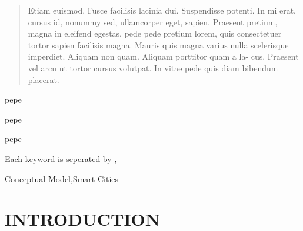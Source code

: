 \documentclass[a4paper,fleqn,spanish]{cas-dc}
\begin{document}
{{%
% 
 \fnmark[2]
% 
 \ead{}
% 
 \ead[url]{}
% 
 \credit{}
% 
% 



\nonumnote{}


\begin{abstract}
Etiam euismod. Fusce facilisis lacinia dui. Suspendisse potenti. In mi erat,
cursus id, nonummy sed, ullamcorper eget, sapien. Praesent pretium, magna in
eleifend egestas, pede pede pretium lorem, quis consectetuer tortor sapien
facilisis magna. Mauris quis magna varius nulla scelerisque imperdiet. Aliquam
non quam. Aliquam porttitor quam a la- cus. Praesent vel arcu ut tortor cursus
volutpat. In vitae pede quis diam bibendum placerat.
\end{abstract}


\begin{graphicalabstract}
\end{graphicalabstract}

\begin{highlights}
 \item pepe
 \item pepe
 \item pepe
\end{highlights}


 Each keyword is seperated by \sep
\begin{keywords}
 Conceptual Model\sep Smart Cities
 \end{keywords}

\maketitle

\section{INTRODUCTION}\label{intro}
\lipsum[12]

}}
\end{document}
